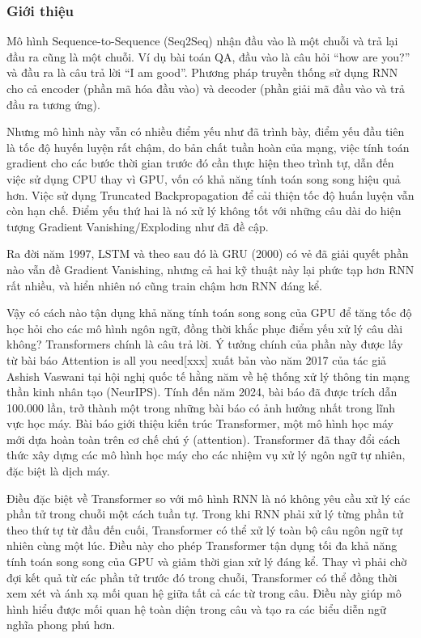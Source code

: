 \subsubsection{Giới thiệu}
Mô hình Sequence-to-Sequence (Seq2Seq) nhận đầu vào là một chuỗi và trả lại đầu ra cũng là một chuỗi. Ví dụ bài toán QA, đầu vào là câu hỏi ``how are you?'' và đầu ra là câu trả lời ``I am good''. Phương pháp truyền thống sử dụng RNN cho cả encoder (phần mã hóa đầu vào) và decoder (phần giải mã đầu vào và trả đầu ra tương ứng).

Nhưng mô hình này vẫn có nhiều điểm yếu như đã trình bày, điểm yếu đầu tiên là tốc độ huyến luyện rất chậm, do bản chất tuần hoàn của mạng, việc tính toán gradient cho các bước thời gian trước đó cần thực hiện theo trình tự, dẫn đến việc sử dụng CPU thay vì GPU, vốn có khả năng tính toán song song hiệu quả hơn. Việc sử dụng Truncated Backpropagation để cải thiện tốc độ huấn luyện vẫn còn hạn chế. Điểm yếu thứ hai là nó xử lý không tốt với những câu dài do hiện tượng Gradient Vanishing/Exploding như đã đề cập.

Ra đời năm 1997, LSTM và theo sau đó là GRU (2000) có vẻ đã giải quyết phần nào vẫn đề Gradient Vanishing, nhưng cả hai kỹ thuật này lại phức tạp hơn RNN rất nhiều, và hiển nhiên nó cũng train chậm hơn RNN đáng kể.

Vậy có cách nào tận dụng khả năng tính toán song song của GPU để tăng tốc độ học hỏi cho các mô hình ngôn ngữ, đồng thời khắc phục điểm yếu xử lý câu dài không? Transformers chính là câu trả lời. Ý tưởng chính của phần này được lấy từ bài báo Attention is all you need[xxx] xuất bản vào năm 2017 của tác giả Ashish Vaswani tại hội nghị quốc tế hằng năm về hệ thống xử lý thông tin mạng thần kinh nhân tạo (NeurIPS). Tính đến năm 2024, bài báo đã được trích dẫn 100.000 lần, trở thành một trong những bài báo có ảnh hưởng nhất trong lĩnh vực học máy. Bài báo giới thiệu kiến trúc Transformer, một mô hình học máy mới dựa hoàn toàn trên cơ chế chú ý (attention). Transformer đã thay đổi cách thức xây dựng các mô hình học máy cho các nhiệm vụ xử lý ngôn ngữ tự nhiên, đặc biệt là dịch máy.

Điều đặc biệt về Transformer so với mô hình RNN là nó không yêu cầu xử lý các phần tử trong chuỗi một cách tuần tự. Trong khi RNN phải xử lý từng phần tử theo thứ tự từ đầu đến cuối, Transformer có thể xử lý toàn bộ câu ngôn ngữ tự nhiên cùng một lúc. Điều này cho phép Transformer tận dụng tối đa khả năng tính toán song song của GPU và giảm thời gian xử lý đáng kể. Thay vì phải chờ đợi kết quả từ các phần tử trước đó trong chuỗi, Transformer có thể đồng thời xem xét và ánh xạ mối quan hệ giữa tất cả các từ trong câu. Điều này giúp mô hình hiểu được mối quan hệ toàn diện trong câu và tạo ra các biểu diễn ngữ nghĩa phong phú hơn.

